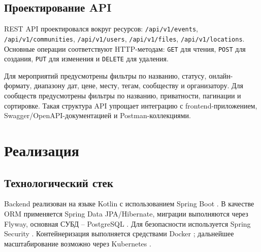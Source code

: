 
\subsection{Проектирование API}

REST API проектировался вокруг ресурсов: \texttt{/api/v1/events}, \texttt{/api/v1/communities}, \texttt{/api/v1/users}, \texttt{/api/v1/files}, \texttt{/api/v1/locations}. Основные операции соответствуют HTTP-методам: \texttt{GET} для чтения, \texttt{POST} для создания, \texttt{PUT} для изменения и \texttt{DELETE} для удаления.

Для мероприятий предусмотрены фильтры по названию, статусу, онлайн-формату, диапазону дат, цене, месту, тегам, сообществу и организатору. Для сообществ предусмотрены фильтры по названию, приватности, пагинации и сортировке. Такая структура API упрощает интеграцию с frontend-приложением, Swagger/OpenAPI-документацией и Postman-коллекциями.

\section{Реализация}

\subsection{Технологический стек}

Backend реализован на языке Kotlin с использованием Spring Boot \cite{springboot}. В качестве ORM применяется Spring Data JPA/Hibernate, миграции выполняются через Flyway, основная СУБД -- PostgreSQL \cite{postgresql}. Для безопасности используется Spring Security \cite{springsecurity}. Контейнеризация выполняется средствами Docker \cite{docker}; дальнейшее масштабирование возможно через Kubernetes \cite{kubernetes}.

